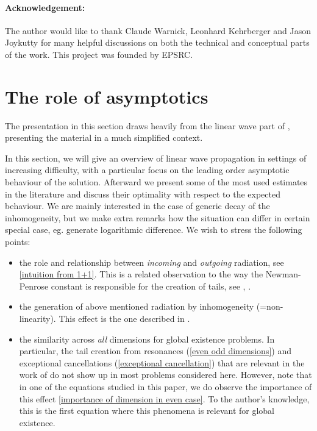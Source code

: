 \documentclass[11pt, oneside]{amsart}
\begin{document}
	\paragraph{\textbf{Acknowledgement:}} The author would like to thank Claude Warnick, Leonhard Kehrberger and Jason Joykutty for  many helpful discussions on both the technical and conceptual parts of the work. This project was founded by EPSRC.
	
	
	\section{The role of asymptotics}\label{role of asymptotics}
	The presentation in this section draws heavily from the linear wave part of \cite{hintz_stability_2020}, presenting the material in a much simplified context.

	In this section, we will give an overview of linear wave propagation in settings of increasing difficulty, with a particular focus on the leading order asymptotic behaviour of the solution. Afterward we present some of the most used estimates in the literature and discuss their optimality with respect to the expected behaviour. We are mainly interested in the case of generic decay of the inhomogeneity, but we make extra remarks how the situation can differ in certain special case, eg. generate logarithmic difference. We wish to stress the following points:
	\begin{itemize}
		\item the role and relationship between \textit{incoming} and \textit{outgoing} radiation, see \cref{intuition from 1+1}. This is a related observation to the way the Newman-Penrose constant is responsible for the creation of tails, see \cite{angelopoulos_late-time_2018}, \cite{gajic_relation_2022}.
		\item the generation of above mentioned radiation by inhomogeneity (=non-linearity). This effect is the one described in \cite{luk_tale_2021}.
		\item the similarity across \textit{all} dimensions for global existence problems. In particular, the tail creation from resonances (\cref{even odd dimensions}) and exceptional cancellations (\cref{exceptional cancellation}) that are relevant in the work of \cite{luk_tale_2021} do not show up in most problems considered here. However, note that in one of the equations studied in this paper, we do observe the importance of this effect \cref{importance of dimension in even case}. To the author's knowledge, this is the first equation where this phenomena is relevant for global existence.
	\end{itemize}
	
\end{document}
